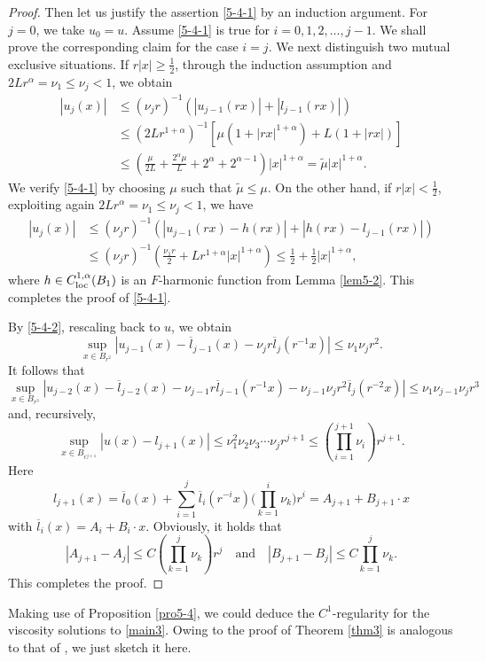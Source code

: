 \documentclass[11pt,reqno]{amsart}
\numberwithin{equation}{section}
\begin{document}
\begin{proof}
Then let us justify the assertion \eqref{5-4-1} by an induction argument. For $j=0$, we take $u_0=u$. Assume \eqref{5-4-1} is true for $i=0,1,2,\dots,j-1$.
We shall prove the corresponding claim for the case $i=j$. We next distinguish two mutual exclusive situations. If $r|x|\ge\frac{1}{2}$, through the induction assumption and $2Lr^\alpha=\nu_1\le\nu_j<1$, we obtain
\begin{align*}
|u_j(x)|&\le (\nu_jr)^{-1}(|u_{j-1}(rx)|+|l_{j-1}(rx)|)\\
&\le(2Lr^{1+\alpha})^{-1}[\mu(1+|rx|^{1+\alpha})+L(1+|rx|)]\\
&\le\left(\frac{\mu}{2L}+\frac{2^\alpha\mu}{L}+2^\alpha+2^{\alpha-1}\right)|x|^{1+\alpha}=\widetilde{\mu}|x|^{1+\alpha}.
\end{align*}
We verify \eqref{5-4-1} by choosing $\mu$ such that $\widetilde{\mu}\le\mu$. On the other hand, if $r|x|<\frac{1}{2}$, exploiting again $2Lr^\alpha=\nu_1\le\nu_j<1$, we have
\begin{align*}
|u_j(x)|&\le (\nu_jr)^{-1}(|u_{j-1}(rx)-h(rx)|+|h(rx)-l_{j-1}(rx)|)\\
&\le(\nu_jr)^{-1}\left(\frac{\nu_1r}{2}+Lr^{1+\alpha}|x|^{1+\alpha}\right)
\le\frac{1}{2}+\frac{1}{2}|x|^{1+\alpha},
\end{align*}
where $h\in C^{1,\alpha}_{\rm loc}(B_1)$ is an $F$-harmonic function from Lemma \ref{lem5-2}.
This completes the proof of \eqref{5-4-1}.

By \eqref{5-4-2}, rescaling back to $u$, we obtain
$$
\sup_{x\in B_{r^2}}|u_{j-1}(x)-\overline{l}_{j-1}(x)-\nu_jr\overline{l}_j(r^{-1}x)|\le \nu_1\nu_jr^2.
$$
It follows that
$$
\sup_{x\in B_{r^3}}|u_{j-2}(x)-\overline{l}_{j-2}(x)-\nu_{j-1}r\overline{l}_{j-1}(r^{-1}x)-\nu_{j-1}\nu_jr^2\overline{l}_j(r^{-2}x)|\le \nu_1\nu_{j-1}\nu_jr^3
$$
and, recursively,
$$
\sup_{x\in B_{r^{j+1}}}|u(x)-l_{j+1}(x)|\le \nu_1^2\nu_2\nu_3\cdots\nu_jr^{j+1}\le \left(\prod^{j+1}_{i=1}\nu_i\right)r^{j+1}.
$$
Here
$$
l_{j+1}(x)=\overline{l}_0(x)+\sum^j_{i=1}\overline{l}_i(r^{-i}x)\biggl(\prod^{i}_{k=1}\nu_k\biggr)r^i=A_{j+1}+B_{j+1}\cdot x
$$
with $\overline{l}_i(x)=A_i+B_i\cdot x$. Obviously, it holds that
$$
|A_{j+1}-A_{j}|\le C\left(\prod^{j}_{k=1}\nu_k\right)r^j
\quad\text{and}\quad
|B_{j+1}-B_{j}|\le C\prod^{j}_{k=1}\nu_k.
$$
This completes the proof.
\end{proof}

Making use of Proposition \ref{pro5-4}, we could deduce the $C^1$-regularity for the viscosity solutions to \eqref{main3}. Owing to the proof of Theorem \ref{thm3} is analogous to that of \cite[Theorem 1]{APPT22}, we just sketch it here.
\end{document}
